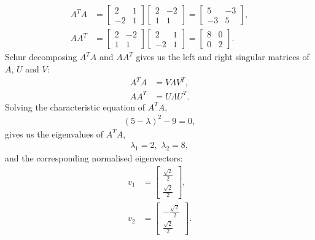 \documentclass[11pt]{article}
\begin{document}
\subsection{}
\begin{equation}\begin{split} 
A^TA&=\begin{bmatrix} 2 & 1\\-2&1 \end{bmatrix}\begin{bmatrix} 2&-2\\1&1\end{bmatrix}=\begin{bmatrix} 5&-3\\-3&5\end{bmatrix},\\
AA^T&=\begin{bmatrix} 2&-2\\1&1\end{bmatrix}\begin{bmatrix} 2 & 1\\-2&1 \end{bmatrix}=\begin{bmatrix} 8 & 0\\0 & 2\end{bmatrix}.
\end{split}\nonumber\end{equation}
Schur decomposing $A^TA$ and $AA^T$ gives us the left and right singular matrices of $A$, $U$ and $V$:
\begin{equation}\begin{split} A^TA&=V\Lambda V^T,\\AA^T&=U\Lambda U^T.\end{split}\nonumber\end{equation} 
Solving the characteristic equation of $A^TA$, 
\begin{equation}\begin{split} (5-\lambda)^2-9=0,\end{split}\nonumber\end{equation}
gives us the eigenvalues of $A^TA$, 
\begin{equation}\begin{split} \lambda_1=2,\,\,\lambda_2=8,\end{split}\nonumber\end{equation} 
and the corresponding normalised eigenvectors:
\begin{equation}\begin{split} v_1 &= \begin{bmatrix} \frac{\sqrt{2}}2 \\ \frac{\sqrt{2}}2\end{bmatrix}, \\
 v_2 &= \begin{bmatrix}-\frac{\sqrt{2}}2 \\ \frac{\sqrt{2}}2\end{bmatrix}.
\end{split}\nonumber\end{equation} 
\end{document}
